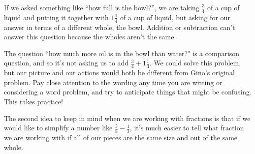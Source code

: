 \documentclass{ximera}
\begin{document}
If we asked something like ``how full is the bowl?'', we are taking $\frac{3}{4}$ of a cup of liquid and putting it together with $1 \frac{1}{4}$ of a cup of liquid, but asking for our answer in terms of a different whole, the bowl. Addition or subtraction can't answer this question because the wholes aren't the same. 

The question ``how much more oil is in the bowl than water?" is a comparison question, and so it's not asking us to add $\frac{3}{4} + 1 \frac{1}{4}$. We could solve this problem, but our picture and our actions would both be different from Gino's original problem. Pay close attention to the wording any time you are writing or considering a word problem, and try to anticipate things that might be confusing. This takes practice!

The second idea to keep in mind when we are working with fractions is that if we would like to simplify a number like $\frac{5}{8} - \frac{1}{3}$, it's much easier to tell what fraction we are working with if all of our pieces are the same size and out of the same whole. 
\end{document}
